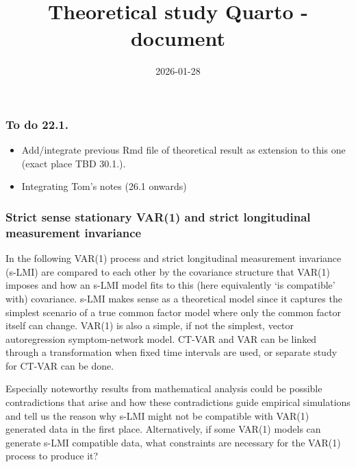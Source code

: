 \documentclass[
  letterpaper,
  DIV=11,
  numbers=noendperiod]{scrartcl}
\title{Theoretical study Quarto -document}
\author{}
\date{2026-01-28}
\begin{document}
\maketitle
\ifdefined\Shaded\renewenvironment{Shaded}{\begin{tcolorbox}[boxrule=0pt, enhanced, sharp corners, borderline west={3pt}{0pt}{shadecolor}, frame hidden, breakable, interior hidden]}{\end{tcolorbox}}\fi

\hypertarget{to-do-22.1.}{%
\subsubsection{To do 22.1.}\label{to-do-22.1.}}

\begin{itemize}
\item
  Add/integrate previous Rmd file of theoretical result as extension to
  this one (exact place TBD 30.1.).
\item
  Integrating Tom's notes (26.1 onwards)
\end{itemize}

\hypertarget{strict-sense-stationary-var1-and-strict-longitudinal-measurement-invariance}{%
\subsubsection{Strict sense stationary VAR(1) and strict longitudinal
measurement
invariance}\label{strict-sense-stationary-var1-and-strict-longitudinal-measurement-invariance}}

In the following VAR(1) process and strict longitudinal measurement
invariance (s-LMI) are compared to each other by the covariance
structure that VAR(1) imposes and how an s-LMI model fits to this (here
equivalently `is compatible' with) covariance. s-LMI makes sense as a
theoretical model since it captures the simplest scenario of a true
common factor model where only the common factor itself can change.
VAR(1) is also a simple, if not the simplest, vector autoregression
symptom-network model. CT-VAR and VAR can be linked through a
transformation when fixed time intervals are used, or separate study for
CT-VAR can be done.

Especially noteworthy results from mathematical analysis could be
possible contradictions that arise and how these contradictions guide
empirical simulations and tell us the reason why s-LMI might not be
compatible with VAR(1) generated data in the first place. Alternatively,
if some VAR(1) models can generate s-LMI compatible data, what
constraints are necessary for the VAR(1) process to produce it?
\end{document}
